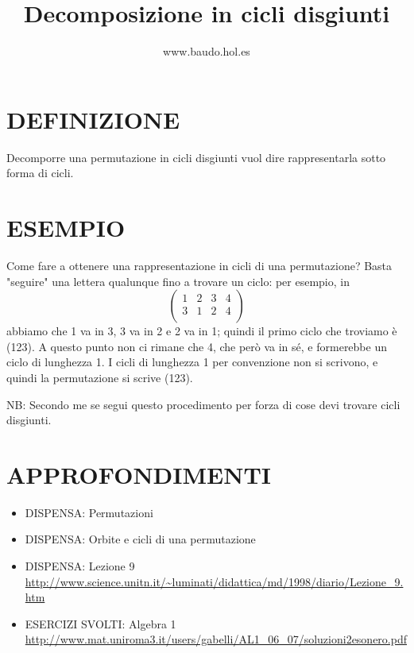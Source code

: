 \documentclass[a4paper,10pt]{article}
\title{Decomposizione in cicli disgiunti}
\author{www.baudo.hol.es}
\begin{document}
\maketitle

\section{DEFINIZIONE}
Decomporre una permutazione in cicli disgiunti vuol dire rappresentarla sotto forma di cicli.

\section{ESEMPIO}
Come fare a ottenere una rappresentazione in cicli di una permutazione? Basta "seguire" una lettera qualunque fino a trovare
un ciclo: per esempio, in 
\[
\left( \begin{array}{cccc} 1 & 2 & 3 & 4 \\ 3 & 1 & 2 & 4 \\ \end{array} \right) 
\]
abbiamo che 1 va in 3, 3 va in 2 e 2 va in 1; quindi il primo ciclo che troviamo è (123). A questo punto non ci rimane che 4,
che però va in sé, e formerebbe un ciclo di lunghezza 1. I cicli di lunghezza 1 per convenzione non si scrivono, e
quindi la permutazione si scrive (123).

NB: Secondo me se segui questo procedimento per forza di cose devi trovare cicli disgiunti.

\section{APPROFONDIMENTI}
\begin{itemize}
 \item DISPENSA: Permutazioni \cite{permutazione2}
 \item DISPENSA: Orbite e cicli di una permutazione \cite{permutazione4}
 \item DISPENSA: Lezione 9 \url{http://www.science.unitn.it/~luminati/didattica/md/1998/diario/Lezione_9.htm}
 \item ESERCIZI SVOLTI: Algebra 1 \url{http://www.mat.uniroma3.it/users/gabelli/AL1_06_07/soluzioni2esonero.pdf}
\end{itemize}



\end{document}
